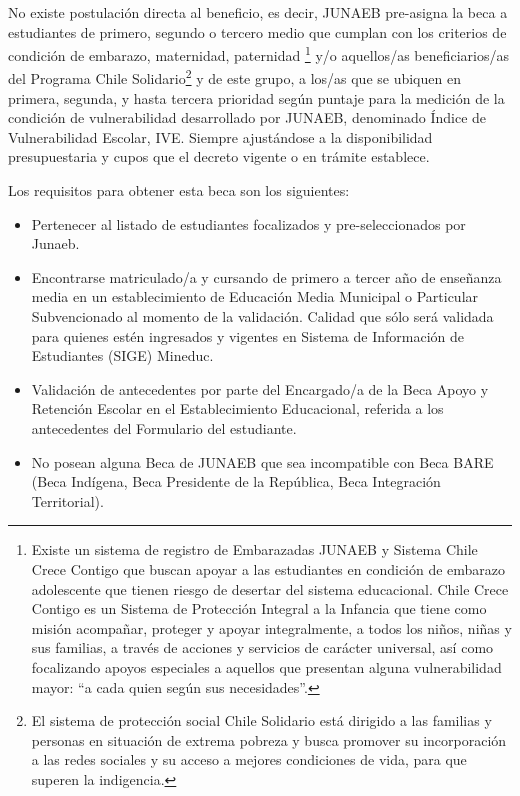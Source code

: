 No existe postulación directa al beneficio, es decir, JUNAEB pre-asigna la beca a estudiantes de primero, segundo o tercero medio que cumplan con los criterios de condición de embarazo, maternidad, paternidad \footnote{Existe un sistema de registro de Embarazadas JUNAEB y Sistema Chile Crece Contigo que buscan apoyar a las estudiantes en condición de embarazo adolescente que tienen riesgo de desertar del sistema educacional. Chile Crece Contigo es un Sistema de Protección Integral a la Infancia que tiene como misión acompañar, proteger y apoyar integralmente, a todos los niños, niñas y sus familias, a través de acciones y servicios de carácter universal, así como focalizando apoyos especiales a aquellos que presentan alguna vulnerabilidad mayor: “a cada quien según sus necesidades”.\cite{chcct}} y/o aquellos/as beneficiarios/as del Programa Chile Solidario\footnote{El sistema de protección social Chile Solidario está dirigido a las familias y personas en situación de extrema pobreza y busca promover su incorporación a las redes sociales y su acceso a mejores condiciones de vida, para que superen la indigencia.} y de este grupo, a los/as que se ubiquen en primera, segunda, y hasta tercera prioridad según puntaje para la medición de la condición de vulnerabilidad desarrollado por JUNAEB, denominado Índice de Vulnerabilidad Escolar, IVE. Siempre ajustándose a la disponibilidad presupuestaria y cupos que el decreto vigente o en trámite establece.\cite{bare}

Los requisitos para obtener esta beca son los siguientes: 
\begin{itemize}
\item Pertenecer al listado de estudiantes focalizados y pre-seleccionados por Junaeb.
\item Encontrarse matriculado/a y cursando de primero a tercer año de enseñanza media en un establecimiento de Educación Media Municipal o Particular Subvencionado al momento de la validación. Calidad que sólo será validada para quienes estén ingresados y vigentes en Sistema de Información de Estudiantes (SIGE) Mineduc.
\item Validación de antecedentes por parte del Encargado/a de la Beca Apoyo y Retención Escolar en el Establecimiento Educacional, referida a los antecedentes del Formulario del estudiante.
\item No posean alguna Beca de JUNAEB que sea incompatible con Beca BARE (Beca Indígena, Beca Presidente de la República, Beca Integración Territorial).
\end{itemize}

